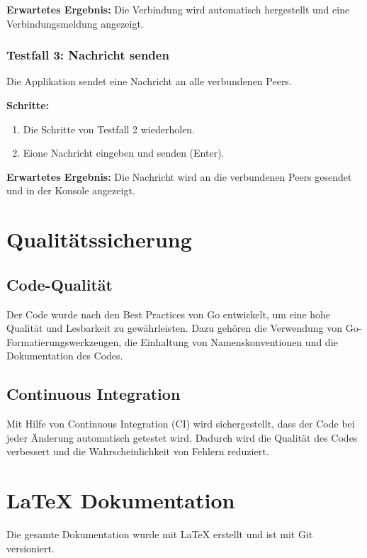 \noindent\textbf{Erwartetes Ergebnis:} Die Verbindung wird automatisch hergestellt und eine Verbindungsmeldung angezeigt.

\subsubsection{Testfall 3: Nachricht senden}
Die Applikation sendet eine Nachricht an alle verbundenen Peers.

\noindent\textbf{Schritte:}
\begin{enumerate}
    \item Die Schritte von Testfall 2 wiederholen.
    \item Eione Nachricht eingeben und senden (Enter).
\end{enumerate}

\noindent\textbf{Erwartetes Ergebnis:} Die Nachricht wird an die verbundenen Peers gesendet und in der Konsole angezeigt.


\newpage
\section{Qualitätssicherung}

\subsection{Code-Qualität}

Der Code wurde nach den Best Practices von Go entwickelt, um eine hohe Qualität und Lesbarkeit zu gewährleisten. Dazu gehören die Verwendung von Go-Formatierungswerkzeugen, die Einhaltung von Namenskonventionen und die Dokumentation des Codes.

\subsection{Continuous Integration}

Mit Hilfe von Continuous Integration (CI) wird sichergestellt, dass der Code bei jeder Änderung automatisch getestet wird. Dadurch wird die Qualität des Codes verbessert und die Wahrscheinlichkeit von Fehlern reduziert. \cite{github_actions_docs}


\section{LaTeX Dokumentation}

Die gesamte Dokumentation wurde mit LaTeX erstellt und ist mit Git versioniert.

